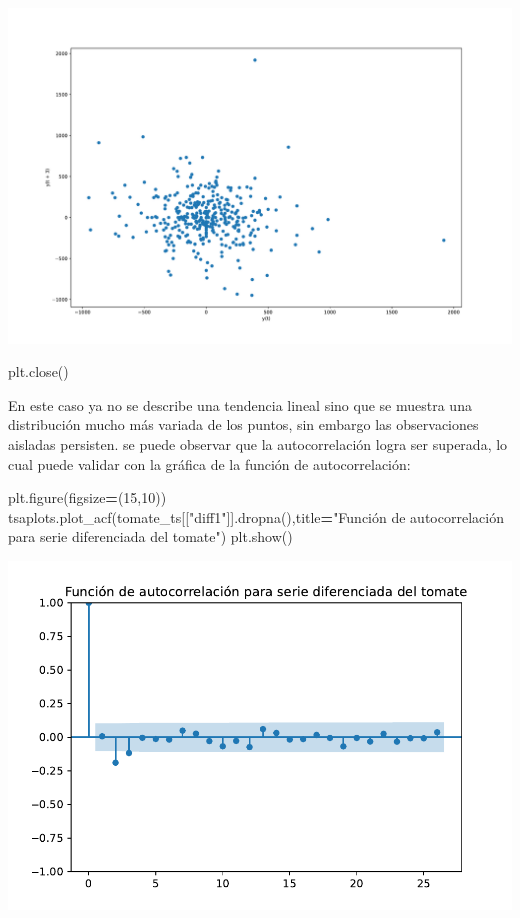 \documentclass[
]{book}
\newenvironment{Shaded}{\begin{snugshade}}{\end{snugshade}}
\newcommand{\DecValTok}[1]{\textcolor[rgb]{0.00,0.00,0.81}{#1}}
\newcommand{\NormalTok}[1]{#1}
\newcommand{\OperatorTok}[1]{\textcolor[rgb]{0.81,0.36,0.00}{\textbf{#1}}}
\newcommand{\StringTok}[1]{\textcolor[rgb]{0.31,0.60,0.02}{#1}}
\begin{document}
\includegraphics{bookdown-demo_files/figure-latex/unnamed-chunk-81-53.pdf}

\begin{Shaded}
\begin{Highlighting}[]
\NormalTok{plt.close()}
\end{Highlighting}
\end{Shaded}

En este caso ya no se describe una tendencia lineal sino que se muestra una distribución mucho más variada de los puntos, sin embargo las observaciones aisladas persisten. se puede observar que la autocorrelación logra ser superada, lo cual puede validar con la gráfica de la función de autocorrelación:

\begin{Shaded}
\begin{Highlighting}[]

\NormalTok{plt.figure(figsize}\OperatorTok{=}\NormalTok{(}\DecValTok{15}\NormalTok{,}\DecValTok{10}\NormalTok{))}
\NormalTok{tsaplots.plot\_acf(tomate\_ts[[}\StringTok{"diff1"}\NormalTok{]].dropna(),title}\OperatorTok{=}\StringTok{"Función de autocorrelación para serie diferenciada del tomate"}\NormalTok{)}
\NormalTok{plt.show()}
\end{Highlighting}
\end{Shaded}

\includegraphics{bookdown-demo_files/figure-latex/unnamed-chunk-82-55.pdf}
\end{document}
